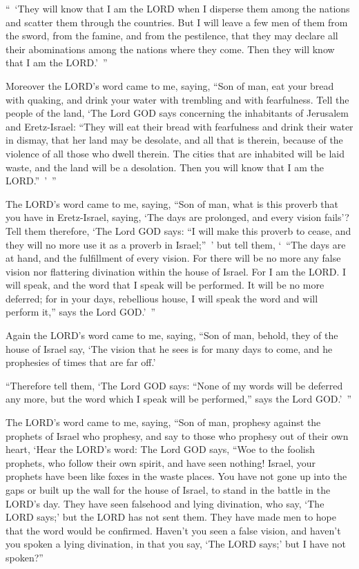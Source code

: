 \myverse{}“ ‘They will know that I am the LORD when I disperse them among
the nations and scatter them through the countries.
\myverse{}But I will leave a few men of them from the sword, from the famine, and from
the pestilence, that they may declare all their abominations among the nations where they come. Then they
will know that I am the LORD.’ ”

\myverse{}Moreover the LORD’s word came to me, saying,
\myverse{}“Son of man, eat your bread with quaking, and drink your water with trembling
and with fearfulness.
\myverse{}Tell the people of the land, ‘The Lord GOD says concerning the inhabitants
of Jerusalem and Eretz-Israel: “They will eat their bread with fearfulness and drink their water in dismay,
that her land may be desolate, and all that is therein, because of the violence of all those who dwell
therein.
\myverse{}The cities that are inhabited will be laid waste, and the land will be a
desolation. Then you will know that I am the LORD.” ’ ”

\myverse{}The LORD’s word came to me, saying,
\myverse{}“Son of man, what is this proverb that you have in Eretz-Israel, saying,
‘The days are prolonged, and every vision fails’?
\myverse{}Tell them therefore, ‘The Lord GOD says: “I will make this proverb to cease,
and they will no more use it as a proverb in Israel;” ’ but tell them, ‘ “The days are at hand, and the
fulfillment of every vision.
\myverse{}For there will be no more any false vision nor flattering divination within
the house of Israel.
\myverse{}For I am the LORD. I will speak, and the word that I speak will be performed.
It will be no more deferred; for in your days, rebellious house, I will speak the word and will perform
it,” says the Lord GOD.’ ”

\myverse{}Again the LORD’s word came to me, saying,
\myverse{}“Son of man, behold, they of the house of Israel say, ‘The vision that he
sees is for many days to come, and he prophesies of times that are far off.’

\myverse{}“Therefore tell them, ‘The Lord GOD says: “None of my words
will be deferred any more, but the word which I speak will be performed,” says the Lord GOD.’ ”


\mychapter{} \myverse*{}The LORD’s word came to me, saying,
\myverse{}“Son of man, prophesy against the prophets of Israel who prophesy, and say
to those who prophesy out of their own heart, ‘Hear the LORD’s word:
\myverse{}The Lord GOD says, “Woe to the foolish prophets, who follow their own spirit,
and have seen nothing!
\myverse{}Israel, your prophets have been like foxes in the waste places.
\myverse{}You have not gone up into the gaps or built up the wall for the house of Israel,
to stand in the battle in the LORD’s day.
\myverse{}They have seen falsehood and lying divination, who say, ‘The LORD says;’ but
the LORD has not sent them. They have made men to hope that the word would be confirmed.
\myverse{}Haven’t you seen a false vision, and haven’t you spoken a lying divination,
in that you say, ‘The LORD says;’ but I have not spoken?”

